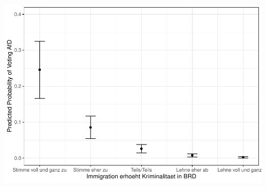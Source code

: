 \documentclass[
]{article}
\begin{document}
\includegraphics{AVCD_Final_Assignment-Edenhofer_latest_files/figure-latex/afd-immig-crime-1.pdf}
\end{document}
